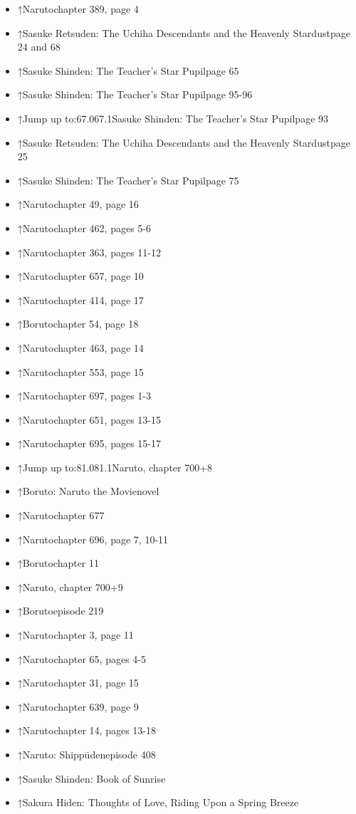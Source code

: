 \documentclass[a4paper,12pt]{article}
\begin{document}
\begin{itemize}
\item ↑Narutochapter 389, page 4
\item ↑Sasuke Retsuden: The Uchiha Descendants and the Heavenly Stardustpage 24 and 68
\item ↑Sasuke Shinden: The Teacher's Star Pupilpage 65
\item ↑Sasuke Shinden: The Teacher's Star Pupilpage 95-96
\item ↑Jump up to:67.067.1Sasuke Shinden: The Teacher's Star Pupilpage 93
\item ↑Sasuke Retsuden: The Uchiha Descendants and the Heavenly Stardustpage 25
\item ↑Sasuke Shinden: The Teacher's Star Pupilpage 75
\item ↑Narutochapter 49, page 16
\item ↑Narutochapter 462, pages 5-6
\item ↑Narutochapter 363, pages 11-12
\item ↑Narutochapter 657, page 10
\item ↑Narutochapter 414, page 17
\item ↑Borutochapter 54, page 18
\item ↑Narutochapter 463, page 14
\item ↑Narutochapter 553, page 15
\item ↑Narutochapter 697, pages 1-3
\item ↑Narutochapter 651, pages 13-15
\item ↑Narutochapter 695, pages 15-17
\item ↑Jump up to:81.081.1Naruto, chapter 700+8
\item ↑Boruto: Naruto the Movienovel
\item ↑Narutochapter 677
\item ↑Narutochapter 696, page 7, 10-11
\item ↑Borutochapter 11
\item ↑Naruto, chapter 700+9
\item ↑Borutoepisode 219
\item ↑Narutochapter 3, page 11
\item ↑Narutochapter 65, pages 4-5
\item ↑Narutochapter 31, page 15
\item ↑Narutochapter 639, page 9
\item ↑Narutochapter 14, pages 13-18
\item ↑Naruto: Shippūdenepisode 408
\item ↑Sasuke Shinden: Book of Sunrise
\item ↑Sakura Hiden: Thoughts of Love, Riding Upon a Spring Breeze

\end{itemize}
\end{document}
